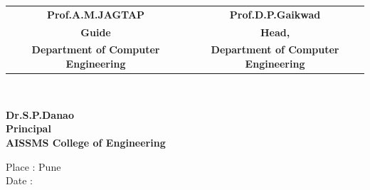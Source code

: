  \vspace{1.7cm}
\begin{tabular}{c c } 
\bf Prof.A.M.JAGTAP &\hspace{2cm}\bf Prof.D.P.Gaikwad \\
\bf Guide&\hspace{2cm}\bf Head,\\
\bf Department of Computer Engineering &\hspace{1cm} \bf Department of Computer Engineering 
 
\end{tabular}\\
\vspace{1.7cm}
\begin{center}
\hspace{10mm}\bf{Dr.S.P.Danao\\\hspace{5mm}Principal\\\hspace{5mm}AISSMS College of Engineering}
\end{center}
\begin{flushleft}
Place : Pune\\
Date  :  
\end{flushleft}
